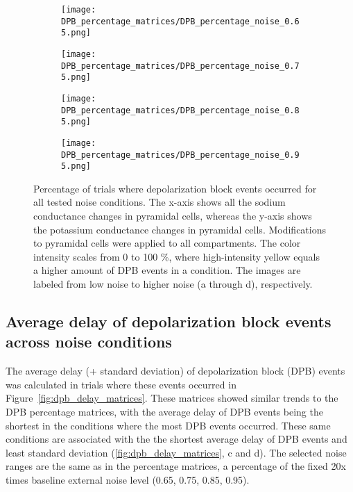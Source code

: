 \begin{figure}[htbp]
    \centering
    \begin{subfigure}{0.48\textwidth}
        \texttt{[image: DPB\_percentage\_matrices/DPB\_percentage\_noise\_0.65.png]}
        \caption{} %
    \end{subfigure}\hfill
    \begin{subfigure}{0.48\textwidth}
        \texttt{[image: DPB\_percentage\_matrices/DPB\_percentage\_noise\_0.75.png]}
        \caption{} %
    \end{subfigure}

    \bigskip %

    \begin{subfigure}{0.48\textwidth}
        \texttt{[image: DPB\_percentage\_matrices/DPB\_percentage\_noise\_0.85.png]}
        \caption{} %
    \end{subfigure}\hfill
    \begin{subfigure}{0.48\textwidth}
        \texttt{[image: DPB\_percentage\_matrices/DPB\_percentage\_noise\_0.95.png]}
        \caption{} %
    \end{subfigure}

    \caption[DPB percentage matrices]{Percentage of trials where depolarization block events occurred for all tested noise conditions.
        The x-axis shows all the sodium conductance changes in pyramidal cells, whereas the y-axis shows the potassium conductance changes in pyramidal cells.
        Modifications to pyramidal cells were applied to all compartments.
        The color intensity scales from 0 to 100 \%, where high-intensity yellow equals a higher amount of DPB events in a condition.
        The images are labeled from low noise to higher noise (a through d), respectively.}\label{fig:dpb_percentage_matrices}
\end{figure}

\subsection{Average delay of depolarization block events across noise conditions}
The average delay (+ standard deviation) of depolarization block (DPB) events was calculated in trials where these events occurred in Figure~\ref{fig:dpb_delay_matrices}.
These matrices showed similar trends to the DPB percentage matrices, with the average delay of DPB events being the shortest in the conditions where the most DPB events occurred.
These same conditions are associated with the the shortest average delay of DPB events and least standard deviation (\ref{fig:dpb_delay_matrices}, c and d).
The selected noise ranges are the same as in the percentage matrices, a percentage of the fixed 20x times baseline external noise level (0.65, 0.75, 0.85, 0.95).

